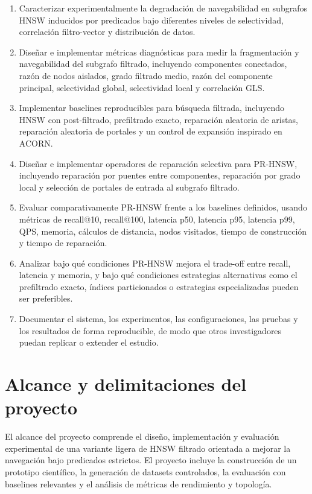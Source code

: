 \begin{enumerate}
    \item Caracterizar experimentalmente la degradación de navegabilidad en subgrafos HNSW inducidos por predicados bajo diferentes niveles de selectividad, correlación filtro-vector y distribución de datos.
    \item Diseñar e implementar métricas diagnósticas para medir la fragmentación y navegabilidad del subgrafo filtrado, incluyendo componentes conectados, razón de nodos aislados, grado filtrado medio, razón del componente principal, selectividad global, selectividad local y correlación GLS.
    \item Implementar baselines reproducibles para búsqueda filtrada, incluyendo HNSW con post-filtrado, prefiltrado exacto, reparación aleatoria de aristas, reparación aleatoria de portales y un control de expansión inspirado en ACORN.
    \item Diseñar e implementar operadores de reparación selectiva para PR-HNSW, incluyendo reparación por puentes entre componentes, reparación por grado local y selección de portales de entrada al subgrafo filtrado.
    \item Evaluar comparativamente PR-HNSW frente a los baselines definidos, usando métricas de recall@10, recall@100, latencia p50, latencia p95, latencia p99, QPS, memoria, cálculos de distancia, nodos visitados, tiempo de construcción y tiempo de reparación.
    \item Analizar bajo qué condiciones PR-HNSW mejora el trade-off entre recall, latencia y memoria, y bajo qué condiciones estrategias alternativas como el prefiltrado exacto, índices particionados o estrategias especializadas pueden ser preferibles.
    \item Documentar el sistema, los experimentos, las configuraciones, las pruebas y los resultados de forma reproducible, de modo que otros investigadores puedan replicar o extender el estudio.
\end{enumerate}

\section{Alcance y delimitaciones del proyecto}

El alcance del proyecto comprende el diseño, implementación y evaluación experimental de una variante ligera de HNSW filtrado orientada a mejorar la navegación bajo predicados estrictos. El proyecto incluye la construcción de un prototipo científico, la generación de datasets controlados, la evaluación con baselines relevantes y el análisis de métricas de rendimiento y topología.


